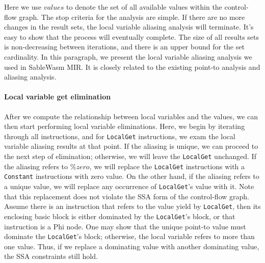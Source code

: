 Here we use $values$ to denote the set of all available values within the control-flow graph. The stop criteria for the analysis are simple. If there are no more changes in the result sets, the local variable aliasing analysis will terminate. It's easy to show that the process will eventually complete. The size of all results sets is non-decreasing between iterations, and there is an upper bound for the set cardinality. In this paragraph, we present the local variable aliasing analysis we used in SableWasm MIR. It is closely related to the existing point-to analysis and aliasing analysis.

\paragraph{Local variable get elimination}
After we compute the relationship between local variables and the values, we can then start performing local variable eliminations. Here, we begin by iterating through all instructions, and for \texttt{LocalGet} instructions, we exam the local variable aliasing results at that point. If the aliasing is unique, we can proceed to the next step of elimination; otherwise, we will leave the \texttt{LocalGet} unchanged. If the aliasing refers to $\%zero$, we will replace the \texttt{LocalGet} instructions with a \texttt{Constant} instructions with zero value. On the other hand, if the aliasing refers to a unique value, we will replace any occurrence of \texttt{LocalGet}'s value with it. Note that this replacement does not violate the SSA form of the control-flow graph. Assume there is an instruction that refers to the value yield by \texttt{LocalGet}, then its enclosing basic block is either dominated by the \texttt{LocalGet}'s block, or that instruction is a Phi node. One may show that the unique point-to value must dominate the \texttt{LocalGet}'s block; otherwise, the local variable refers to more than one value. Thus, if we replace a dominating value with another dominating value, the SSA constraints still hold.


